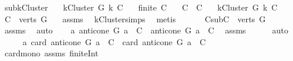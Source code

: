 \begin{isabellebody}
\isanewline
\isanewline
{}\isamarkupfalse%
\ sub{\isacharunderscore}{\kern0pt}kCluster{\isacharcolon}{\kern0pt}\isanewline
\ \ \ {\isachardoublequoteopen}kCluster\ G\ k\ C{\isachardoublequoteclose}\isanewline
\ \ \ {\isachardoublequoteopen}finite\ C{\isachardoublequoteclose}\isanewline
\ \ \ {\isachardoublequoteopen}C{\isacharprime}{\kern0pt}\ {\isasymsubseteq}\ C{\isachardoublequoteclose}\ \ \isanewline
{}\ {\isachardoublequoteopen}kCluster\ G\ k\ C{\isacharprime}{\kern0pt}{\isachardoublequoteclose}\ \isanewline
%
\isadelimproof
%
\endisadelimproof
%
\isatagproof
{}\isamarkupfalse%
{\isacharminus}{\kern0pt}\isanewline
\ \ \isamarkupfalse%
\ {\isachardoublequoteopen}C\ {\isasymsubseteq}\ verts\ G{\isachardoublequoteclose}\ \ \isamarkupfalse%
\ assms{\isacharparenleft}{\kern0pt}{}{\isacharparenright}{\kern0pt}\ \isamarkupfalse%
\ kCluster{\isachardot}{\kern0pt}simps\ \isamarkupfalse%
\ metis\ \isanewline
\ \ \isamarkupfalse%
\ \isamarkupfalse%
\ C{\isacharprime}{\kern0pt}{\isacharunderscore}{\kern0pt}sub{\isacharcolon}{\kern0pt}{\isachardoublequoteopen}C{\isacharprime}{\kern0pt}\ {\isasymsubseteq}\ verts\ G{\isachardoublequoteclose}\ \ \isamarkupfalse%
\ assms{\isacharparenleft}{\kern0pt}{}{\isacharparenright}{\kern0pt}\ \isamarkupfalse%
\ auto\isanewline
\ \ \isamarkupfalse%
\ {\isachardoublequoteopen}{\isasymAnd}a{\isachardot}{\kern0pt}\ {\isacharparenleft}{\kern0pt}anticone\ G\ a\ {\isasyminter}\ C{\isacharprime}{\kern0pt}{\isacharparenright}{\kern0pt}\ {\isasymsubseteq}\ {\isacharparenleft}{\kern0pt}anticone\ G\ a\ {\isasyminter}\ C{\isacharparenright}{\kern0pt}{\isachardoublequoteclose}\ \isamarkupfalse%
\ assms{\isacharparenleft}{\kern0pt}{}{\isacharparenright}{\kern0pt}\isanewline
\ \ \ \ \isamarkupfalse%
\ auto\ \isanewline
\ \ \isamarkupfalse%
\ \isamarkupfalse%
\ {\isachardoublequoteopen}{\isasymAnd}a{\isachardot}{\kern0pt}\ card\ {\isacharparenleft}{\kern0pt}anticone\ G\ a\ {\isasyminter}\ C{\isacharprime}{\kern0pt}{\isacharparenright}{\kern0pt}\ {\isasymle}\ card\ {\isacharparenleft}{\kern0pt}anticone\ G\ a\ {\isasyminter}\ C{\isacharparenright}{\kern0pt}{\isachardoublequoteclose}\isanewline
\ \ \ \ \isamarkupfalse%
\ card{\isacharunderscore}{\kern0pt}mono\ assms{\isacharparenleft}{\kern0pt}{}{\isacharparenright}{\kern0pt}\ finite{\isacharunderscore}{\kern0pt}Int\isanewline

\end{isabellebody}
